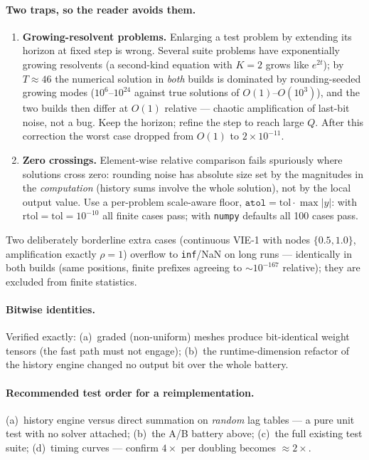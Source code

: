\documentclass[11pt]{article}
\begin{document}
\paragraph{Two traps, so the reader avoids them.}
\begin{enumerate}
\item \textbf{Growing-resolvent problems.} Enlarging a test problem by
  extending its horizon at fixed step is wrong. Several suite problems
  have exponentially growing resolvents (a second-kind equation with
  $K=2$ grows like $e^{2t}$); by $T\approx46$ the numerical solution in
  \emph{both} builds is dominated by rounding-seeded growing modes
  ($10^{6}$--$10^{24}$ against true solutions of $O(1)$--$O(10^3)$),
  and the two builds then differ at $O(1)$ relative --- chaotic
  amplification of last-bit noise, not a bug. Keep the horizon; refine
  the step to reach large $Q$. After this correction the worst case
  dropped from $O(1)$ to $2\times10^{-11}$.
\item \textbf{Zero crossings.} Element-wise relative comparison fails
  spuriously where solutions cross zero: rounding noise has absolute
  size set by the magnitudes in the \emph{computation} (history sums
  involve the whole solution), not by the local output value. Use a
  per-problem scale-aware floor,
  $\texttt{atol}=\mathrm{tol}\cdot\max|y|$: with
  $\mathrm{rtol}=\mathrm{tol}=10^{-10}$ all finite cases pass; with
  \texttt{numpy} defaults all 100 cases pass.
\end{enumerate}
Two deliberately borderline extra cases (continuous VIE-1 with nodes
$\{0.5,1.0\}$, amplification exactly $\rho=1$) overflow to
\texttt{inf}/NaN on long runs --- identically in both builds (same
positions, finite prefixes agreeing to $\sim10^{-167}$ relative); they
are excluded from finite statistics.

\paragraph{Bitwise identities.} Verified exactly: (a)~graded
(non-uniform) meshes produce bit-identical weight tensors (the fast
path must not engage); (b)~the runtime-dimension refactor of the
history engine changed no output bit over the whole battery.

\paragraph{Recommended test order for a reimplementation.}
(a)~history engine versus direct summation on \emph{random} lag tables
--- a pure unit test with no solver attached; (b)~the A/B battery
above; (c)~the full existing test suite; (d)~timing curves ---
confirm $4\times$ per doubling becomes $\approx2\times$.
\end{document}
